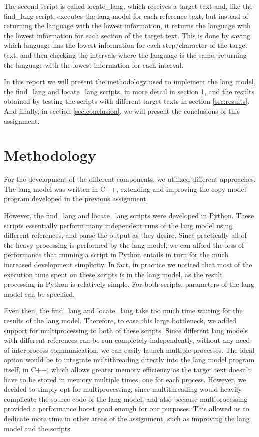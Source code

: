 \documentclass{article}
\begin{document}
The second script is called locate_lang, which receives a target text and, like the find_lang script, executes the lang model for each reference text, but instead of returning the language with the lowest information, it returns the language with the lowest information for each section of the target text.
This is done by saving which language has the lowest information for each step/character of the target text, and then checking the intervals where the language is the same, returning the language with the lowest information for each interval.

In this report we will present the methodology used to implement the lang model, the find_lang and locate_lang scripts, in more detail in section \ref{sec:methodology}, and the results obtained by testing the scripts with different target texts in section \ref{sec:results}.
And finally, in section \ref{sec:conclusion}, we will present the conclusions of this assignment.

\section{Methodology}
\label{sec:methodology}

For the development of the different components, we utilized different approaches.
The lang model was written in C++, extending and improving the copy model program developed in the previous assignment.

However, the find_lang and locate_lang scripts were developed in Python.
These scripts essentially perform many independent runs of the lang model using different references, and parse the output as they desire.
Since practically all of the heavy processing is performed by the lang model, we can afford the loss of performance that running a script in Python entails in turn for the much increased development simplicity.
In fact, in practice we noticed that most of the execution time spent on these scripts is in the lang model, as the result processing in Python is relatively simple.
For both scripts, parameters of the lang model can be specified.

Even then, the find_lang and locate_lang take too much time waiting for the results of the lang model.
Therefore, to ease this large bottleneck, we added support for multiprocessing to both of these scripts.
Since different lang models with different references can be run completely independently, without any need of interprocess communication, we can easily launch multiple processes.
The ideal option would be to integrate multithreading directly into the lang model program itself, in C++, which allows greater memory efficiency as the target text doesn't have to be stored in memory multiple times, one for each process.
However, we decided to simply opt for multiprocessing, since multithreading would heavily complicate the source code of the lang model, and also because multiprocessing provided a performance boost good enough for our purposes.
This allowed us to dedicate more time in other areas of the assignment, such as improving the lang model and the scripts.
\end{document}
